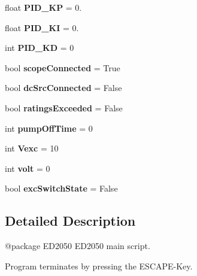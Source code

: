 \begin{DoxyCompactItemize}
\item 
\mbox{\label{namespaceED2050_a4eefd24607e333ffc002c1848bb325d6}} 
float {\bfseries P\+I\+D\+\_\+\+KP} = 0.
\item 
\mbox{\label{namespaceED2050_a42d31a88ebeb68ef1af440b3487a7a4b}} 
float {\bfseries P\+I\+D\+\_\+\+KI} = 0.
\item 
\mbox{\label{namespaceED2050_ae30f1a1cf901a79b449c2f71cdd05410}} 
int {\bfseries P\+I\+D\+\_\+\+KD} = 0
\item 
\mbox{\label{namespaceED2050_aea914630ead0a64c239bef176daae488}} 
bool {\bfseries scope\+Connected} = True
\item 
\mbox{\label{namespaceED2050_afde897f98ae47ac1e7defbee084254e5}} 
bool {\bfseries dc\+Src\+Connected} = False
\item 
\mbox{\label{namespaceED2050_a28da3f0d5e128b7ace80637c653a0b59}} 
bool {\bfseries ratings\+Exceeded} = False
\item 
\mbox{\label{namespaceED2050_a3fca0c2bc1f93bbc7ee0f3c2a5816ee6}} 
int {\bfseries pump\+Off\+Time} = 0
\item 
\mbox{\label{namespaceED2050_a3a7ce9084e36495e5665be5a2d4ea798}} 
int {\bfseries Vexc} = 10
\item 
\mbox{\label{namespaceED2050_a4543b7ea3039f2a95cbc27e0f2a34249}} 
int {\bfseries volt} = 0
\item 
\mbox{\label{namespaceED2050_ac63b73553def372dc06307986396990d}} 
bool {\bfseries exc\+Switch\+State} = False
\end{DoxyCompactItemize}


\subsection{Detailed Description}
\begin{DoxyVerb}@package ED2050
ED2050 main script.

Program terminates by pressing the ESCAPE-Key.
\end{DoxyVerb}
 

